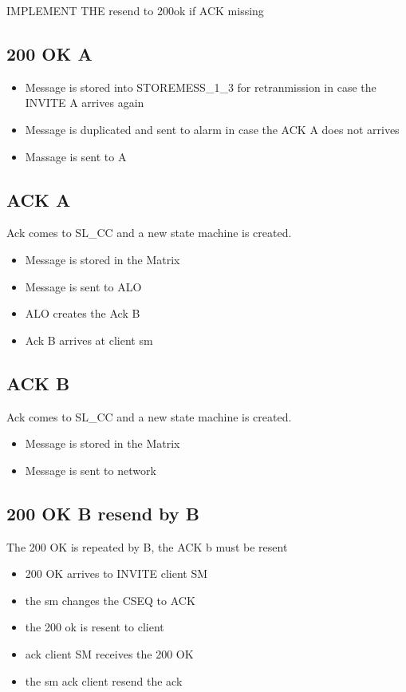 \documentclass[a4paper]{report}
\begin{document}
IMPLEMENT THE resend to 200ok if ACK missing

\subsection{200 OK A}
\begin {itemize}
\item Message is stored into STOREMESS\_1\_3 for retranmission in case the INVITE A arrives again
\item Message is duplicated and sent to alarm in case the ACK A does not arrives
\item Massage is sent to A
\end{itemize}

\subsection{ACK A}
Ack comes to SL\_CC and a new state machine is created.
\begin {itemize}
\item Message is stored in the Matrix 
\item Message is sent to ALO
\item ALO creates the Ack B
\item Ack B arrives at client sm
\end{itemize}

\subsection{ACK B}
Ack comes to SL\_CC and a new state machine is created.
\begin {itemize}
\item Message is stored in the Matrix 
\item Message is sent to network
\end{itemize}

\subsection{200 OK B resend by B}
The 200 OK is repeated by B, the ACK b must be resent
\begin{itemize}
\item 200 OK arrives to INVITE client SM
\item the sm changes the CSEQ to ACK
\item the 200 ok is resent to client
\item ack client SM receives the 200 OK
\item the sm ack client resend the ack
\end{itemize}
\end{document}
